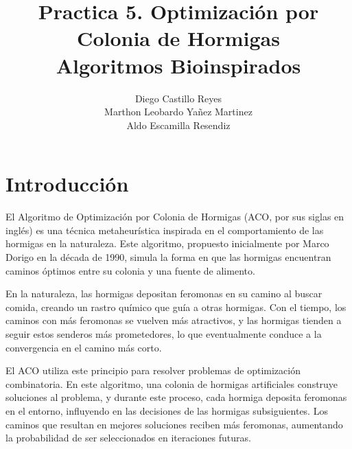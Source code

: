 \documentclass{report}
\title{\Huge{\textbf{Practica 5. Optimización por Colonia de Hormigas}}\\
\Large{\textbf{Algoritmos Bioinspirados}}}
\author{Diego Castillo Reyes\\Marthon Leobardo Yañez Martinez\\Aldo Escamilla Resendiz}
\begin{document}
\maketitle
\tableofcontents
\section{Introducción}
El Algoritmo de Optimización por Colonia de Hormigas (ACO, por sus siglas en inglés) es una técnica metaheurística inspirada en el comportamiento de las hormigas en la naturaleza. Este algoritmo, propuesto inicialmente por Marco Dorigo en la década de 1990, simula la forma en que las hormigas encuentran caminos óptimos entre su colonia y una fuente de alimento.

En la naturaleza, las hormigas depositan feromonas en su camino al buscar comida, creando un rastro químico que guía a otras hormigas. Con el tiempo, los caminos con más feromonas se vuelven más atractivos, y las hormigas tienden a seguir estos senderos más prometedores, lo que eventualmente conduce a la convergencia en el camino más corto.

El ACO utiliza este principio para resolver problemas de optimización combinatoria. En este algoritmo, una colonia de hormigas artificiales construye soluciones al problema, y durante este proceso, cada hormiga deposita feromonas en el entorno, influyendo en las decisiones de las hormigas subsiguientes. Los caminos que resultan en mejores soluciones reciben más feromonas, aumentando la probabilidad de ser seleccionados en iteraciones futuras.
\end{document}
